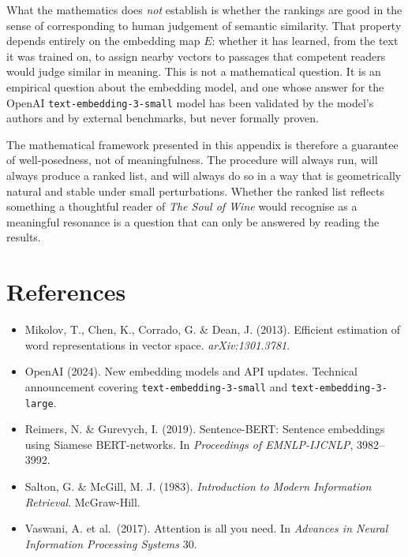 \documentclass[11pt]{article}
\begin{document}
What the mathematics does \emph{not} establish is whether the rankings are good in the sense of corresponding to human judgement of semantic similarity. That property depends entirely on the embedding map $E$: whether it has learned, from the text it was trained on, to assign nearby vectors to passages that competent readers would judge similar in meaning. This is not a mathematical question. It is an empirical question about the embedding model, and one whose answer for the OpenAI \texttt{text-embedding-3-small} model has been validated by the model's authors and by external benchmarks, but never formally proven.

The mathematical framework presented in this appendix is therefore a guarantee of well-posedness, not of meaningfulness. The procedure will always run, will always produce a ranked list, and will always do so in a way that is geometrically natural and stable under small perturbations. Whether the ranked list reflects something a thoughtful reader of \emph{The Soul of Wine} would recognise as a meaningful resonance is a question that can only be answered by reading the results.

\section*{References}

\begin{itemize}[leftmargin=2em,itemsep=0.2em]
\item Mikolov, T., Chen, K., Corrado, G. \& Dean, J. (2013). Efficient estimation of word representations in vector space. \emph{arXiv:1301.3781}.
\item OpenAI (2024). New embedding models and API updates. Technical announcement covering \texttt{text-embedding-3-small} and \texttt{text-embedding-3-large}.
\item Reimers, N. \& Gurevych, I. (2019). Sentence-BERT: Sentence embeddings using Siamese BERT-networks. In \emph{Proceedings of EMNLP-IJCNLP}, 3982--3992.
\item Salton, G. \& McGill, M. J. (1983). \emph{Introduction to Modern Information Retrieval}. McGraw-Hill.
\item Vaswani, A. et al.\ (2017). Attention is all you need. In \emph{Advances in Neural Information Processing Systems} 30.
\end{itemize}
\end{document}
